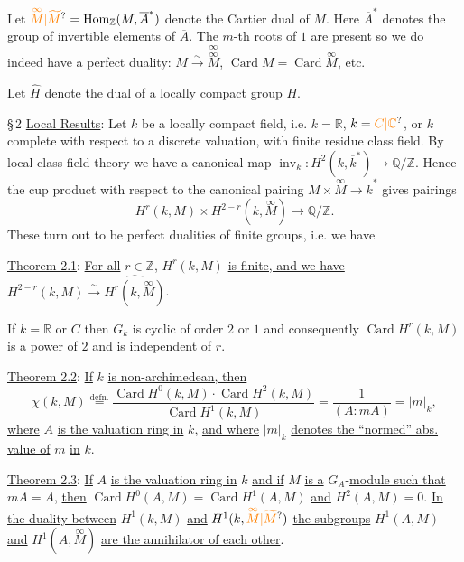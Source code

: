 Let $\unsure{\overset{\infty}{M}|\widetilde M}=\operatorname{Hom}_{\mathbb Z}(M,\overline A^*)$ denote the Cartier dual of $M$. Here $\overline A^*$ denotes the group of invertible elements of $\overline A$. The $m$-th roots of $1$ are present so we do indeed have a perfect duality: $M\xrightarrow{\sim}\overset{\infty}{\overset{\infty}{M}}$, $\operatorname{Card} M=\operatorname{Card}\overset{\infty}{M}$, etc.

Let $\widehat H$ denote the  dual of a locally compact group $H$.

\S\,2 \uline{Local Results}: Let $k$ be a locally compact field, i.e. $k=\mathbb R$, $k=\unsure{C|\mathbb C}$, or $k$ complete with respect to a discrete valuation, with finite residue class field. By local class field theory we have a canonical map $\operatorname{inv}_k:H^2(k,\overline k^*)\longrightarrow\mathbb Q/\mathbb Z$. Hence the cup product with respect to the canonical pairing  $M\times\overset{\infty}{M}\longrightarrow\overline k^*$ gives pairings
\[
H^r(k,M)\times H^{2-r}(k,\overset{\infty}{M})\longrightarrow\mathbb Q/\mathbb Z.
\]
These turn out to be perfect dualities of finite groups, i.e. we have

\uline{Theorem 2.1}: \uline{For all} $r\in\mathbb Z$, $H^r(k,M)$ \uline{is finite, and we have}
$H^{2-r}(k,M)\xrightarrow{\sim}\widehat{H^r(k,\overset{\infty}{M})}$.

If $k=\mathbb R$ or $C$ then $G_k$ is cyclic of order $2$ or $1$ and consequently $\operatorname{Card} H^r(k,M)$ is a power of $2$ and is independent of $r$.

\uline{Theorem 2.2}: \uline{If} $k$ \uline{is non-archimedean, then}
\[
\chi(k,M)\overset{\mathrm{defn.}}{=}
\frac{\operatorname{Card} H^0(k,M)\cdot\operatorname{Card} H^2(k,M)}{\operatorname{Card} H^1(k,M)}
=\frac{1}{(A:mA)}=|m|_k,
\]
\uline{where} $A$ \uline{is the valuation ring in} $k$, \uline{and where} $|m|_k$ \uline{denotes the ``normed'' abs. value of} $m$ \uline{in} $k$.


\uline{Theorem 2.3}: \uline{If} $A$ \uline{is the valuation ring in} $k$ \uline{and if} $M$ \uline{is a} $G_A$-\uline{module such that} $mA=A$, \uline{then} $\operatorname{Card}H^0(A,M)=\operatorname{Card}H^1(A,M)$ \uline{and} $H^2(A,M)=0$. \uline{In the duality between} $H^1(k,M)$ \uline{and} $H^1(k,\unsure{\overset{\infty}{M}|\widetilde M})$ \uline{the subgroups} $H^1(A,M)$ \uline{and} $H^1(A,\overset{\infty}{M})$ \uline{are the annihilator of each other}.

